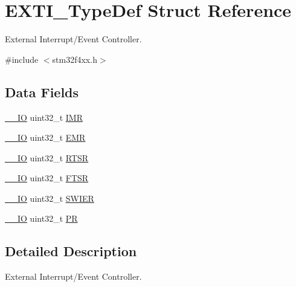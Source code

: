 \hypertarget{struct_e_x_t_i___type_def}{}\section{E\+X\+T\+I\+\_\+\+Type\+Def Struct Reference}
\label{struct_e_x_t_i___type_def}


External Interrupt/\+Event Controller.  




{\ttfamily \#include $<$stm32f4xx.\+h$>$}

\subsection*{Data Fields}
\begin{DoxyCompactItemize}
\item 
\hyperlink{group___c_m_s_i_s__core__definitions_gaec43007d9998a0a0e01faede4133d6be}{\+\_\+\+\_\+\+IO} uint32\+\_\+t \hyperlink{struct_e_x_t_i___type_def_ae845b86e973b4bf8a33c447c261633f6}{I\+MR}
\item 
\hyperlink{group___c_m_s_i_s__core__definitions_gaec43007d9998a0a0e01faede4133d6be}{\+\_\+\+\_\+\+IO} uint32\+\_\+t \hyperlink{struct_e_x_t_i___type_def_a6034c7458d8e6030f6dacecf0f1a3a89}{E\+MR}
\item 
\hyperlink{group___c_m_s_i_s__core__definitions_gaec43007d9998a0a0e01faede4133d6be}{\+\_\+\+\_\+\+IO} uint32\+\_\+t \hyperlink{struct_e_x_t_i___type_def_a0d952a17455687d6e9053730d028fa1d}{R\+T\+SR}
\item 
\hyperlink{group___c_m_s_i_s__core__definitions_gaec43007d9998a0a0e01faede4133d6be}{\+\_\+\+\_\+\+IO} uint32\+\_\+t \hyperlink{struct_e_x_t_i___type_def_aa0f7c828c46ae6f6bc9f66f11720bbe6}{F\+T\+SR}
\item 
\hyperlink{group___c_m_s_i_s__core__definitions_gaec43007d9998a0a0e01faede4133d6be}{\+\_\+\+\_\+\+IO} uint32\+\_\+t \hyperlink{struct_e_x_t_i___type_def_a9eae93b6cc13d4d25e12f2224e2369c9}{S\+W\+I\+ER}
\item 
\hyperlink{group___c_m_s_i_s__core__definitions_gaec43007d9998a0a0e01faede4133d6be}{\+\_\+\+\_\+\+IO} uint32\+\_\+t \hyperlink{struct_e_x_t_i___type_def_af8d25514079514d38c104402f46470af}{PR}
\end{DoxyCompactItemize}


\subsection{Detailed Description}
External Interrupt/\+Event Controller. 

